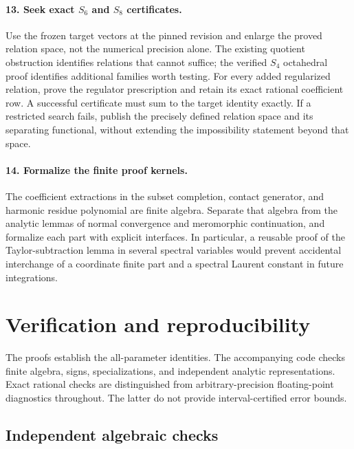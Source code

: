 \documentclass[11pt,a4paper]{article}
\theoremstyle{definition}
\theoremstyle{remark}
\numberwithin{equation}{section}
\begin{document}
\paragraph{13. Seek exact $S_6$ and $S_8$ certificates.}
Use the frozen target vectors at the pinned revision and enlarge the
proved relation space, not the numerical precision alone. The
existing quotient obstruction identifies relations that cannot
suffice; the verified $S_4$ octahedral proof identifies additional
families worth testing. For every added regularized relation,
prove the regulator prescription and retain its exact rational
coefficient row. A successful certificate must sum to the target
identity exactly. If a restricted search fails, publish the
precisely defined relation space and its separating functional,
without extending the impossibility statement beyond that space.

\paragraph{14. Formalize the finite proof kernels.}
The coefficient extractions in the subset completion, contact
generator, and harmonic residue polynomial are finite algebra.
Separate that algebra from the analytic lemmas of normal
convergence and meromorphic continuation, and formalize each part
with explicit interfaces. In particular, a reusable proof of the
Taylor-subtraction lemma in several spectral variables would
prevent accidental interchange of a coordinate finite part and a
spectral Laurent constant in future integrations.


\section{Verification and reproducibility}
\label{verify:sec}

The proofs establish the all-parameter identities. The accompanying
code checks finite algebra, signs, specializations, and independent
analytic representations. Exact rational checks are distinguished
from arbitrary-precision floating-point diagnostics throughout.
The latter do not provide interval-certified error bounds.

\subsection{Independent algebraic checks}
\end{document}
